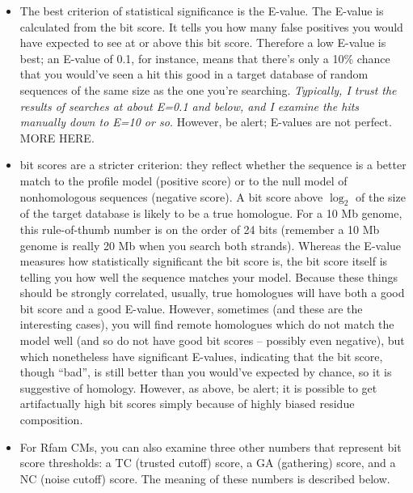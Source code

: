 \begin{itemize}
\item The best criterion of statistical significance is the E-value.
The E-value is calculated from the bit score. It tells you how many
false positives you would have expected to see at or above this bit
score. Therefore a low E-value is best; an E-value of 0.1, for
instance, means that there's only a 10\% chance that you would've seen
a hit this good in a target database of random sequences of the same
size as the one you're searching. {\em
Typically, I trust the results of searches at about E=0.1 and below,
and I examine the hits manually down to E=10 or so.}  However, be
alert;  E-values are not perfect. MORE HERE.

\item {} bit scores are a stricter criterion: they
  reflect whether the sequence is a better match to the profile model
  (positive score) or to the null model of nonhomologous sequences
  (negative score).  A bit score above $\log_2$ of the size of the
  target database is likely to be a true
  homologue. For a 10 Mb genome, this rule-of-thumb number is on
  the order of 24 bits (remember a 10 Mb genome is really 20 Mb when
  you search both strands).  Whereas the E-value measures how
  statistically significant the bit score is, the bit score itself is
  telling you how well the sequence matches your model. Because these
  things should be strongly correlated, usually, true homologues will
  have both a good bit score and a good E-value. However, sometimes
  (and these are the interesting cases), you will find remote
  homologues which do not match the model well (and so do not have
  good bit scores -- possibly even negative), but which nonetheless
  have significant E-values, indicating that the bit score, though
  ``bad'', is still better than you would've expected by chance, so it
  is suggestive of homology. However, as above, be alert; it is
  possible to get artifactually high bit scores simply because of
  highly biased residue composition.
  
\item For Rfam CMs, you can also examine three other numbers that
  represent bit score thresholds: a TC (trusted cutoff) score, a GA
(gathering) score, and a NC (noise cutoff) score. The meaning of
these numbers is described below.
\end{itemize}


